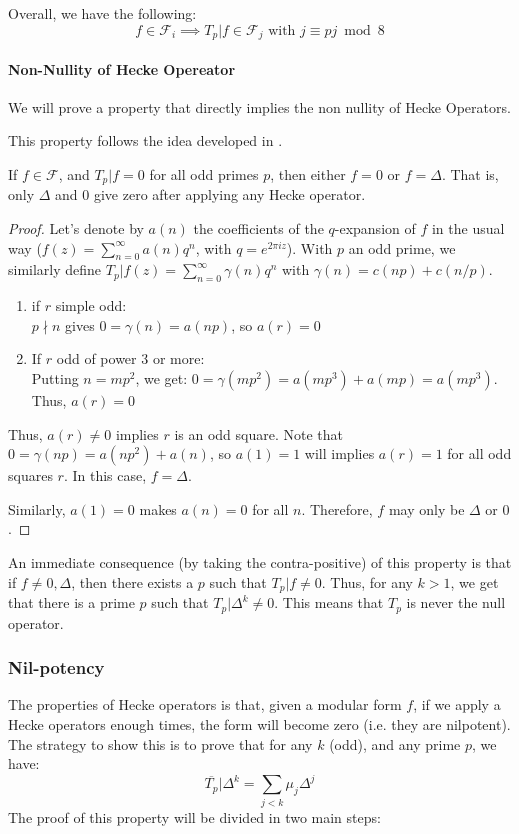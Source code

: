 Overall, we have the following:
$$
f \in \mathcal{F}_i \implies T_p|f \in \mathcal{F}_j
\text{ with } j \equiv pj \bmod 8
$$

\paragraph{Non-Nullity of Hecke Opereator}
\label{HeckeNonNull}
We will prove a property that directly implies the non nullity of Hecke Operators.

This property follows the idea developed in \cite[p.33]{TheWebOfModularityArithmeticOfTheCoefficientsOfModularForms}.
\begin{property}
	If $f \in \mathcal{F}$, and $T_p|f = 0$ for all odd primes $p$, then either $f = 0$ or $f = \Delta$.
	That is, only $\Delta$ and $0$ give zero after applying any Hecke operator.
\end{property}
\begin{proof}
	Let's denote by $a(n)$ the coefficients of the $q$-expansion of $f$ in the usual way ($f(z) = \sum_{n=0}^{\infty} a(n)q^n$, with $q=e^{2\pi i z}$).
	With $p$ an odd prime, we similarly define $T_p|f(z) = \sum_{n=0}^{\infty} \gamma(n)q^n$ with $\gamma(n) = c(np) + c(n/p)$.
	\begin{enumerate}
		\item if $r$ simple odd:\\
		$p \nmid n$ gives $0 = \gamma(n) = a(np)$,
		so $a(r)=0$
		\item If $r$ odd of power 3 or more:\\
		Putting $n=mp^2$, we get: $0 = \gamma(mp^2) = a(mp^3)+a(mp) = a(mp^3)$.\\
		Thus, $a(r)=0$
	\end{enumerate}
	Thus, $a(r) \neq 0$ implies $r$ is an odd square.
	Note that $0 = \gamma(np) = a(np^2) + a(n)$, so $a(1)=1$ will implies $a(r)=1$ for all odd squares $r$.
	In this case, $f = \Delta$.
	
	Similarly, $a(1)=0$ makes $a(n)=0$ for all $n$.
	Therefore, $f$ may only be $\Delta$ or $0$.
\end{proof}

An immediate consequence (by taking the contra-positive) of this property is that if $f \neq 0, \Delta$, then there exists a $p$ such that $T_p|f \neq 0$.
Thus, for any $k > 1$, we get that there is a prime $p$ such that $T_p|\Delta^k \neq 0$.
This means that $T_p$ is never the null operator.

\subsubsection{Nil-potency}
The properties of Hecke operators is that, given a modular form $f$, if we apply a Hecke operators enough times, the form will become zero (i.e. they are nilpotent).
The strategy to show this is to prove that for any $k$ (odd), and any prime $p$, we have:
$$
\overline{T_p}| \Delta^k = \sum_{j < k} \mu_j \Delta^j
$$
The proof of this property will be divided in two main steps:

